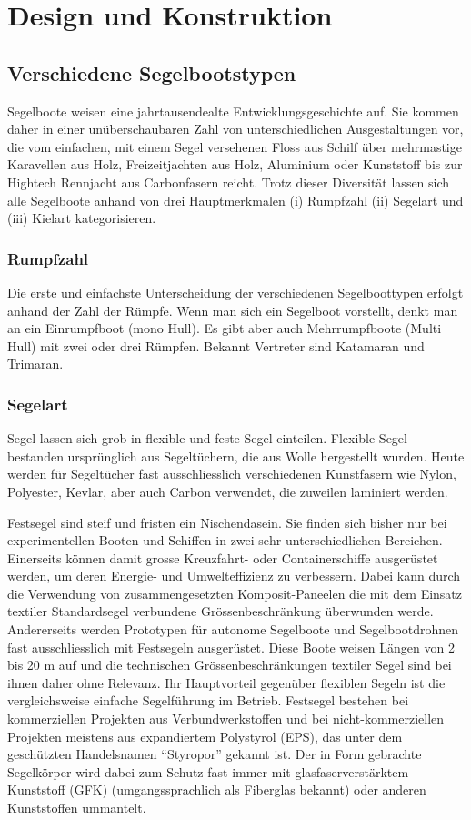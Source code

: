 


\label{chap:konstruktion}
\chapter{Design und Konstruktion}
\section{Verschiedene Segelbootstypen}
Segelboote weisen eine jahrtausendealte Entwicklungsgeschichte auf. Sie kommen daher in einer unüberschaubaren Zahl von unterschiedlichen Ausgestaltungen vor, die vom einfachen, mit einem Segel versehenen Floss aus Schilf über mehrmastige Karavellen aus Holz, Freizeitjachten aus Holz, Aluminium oder Kunststoff bis zur Hightech Rennjacht aus Carbonfasern reicht. Trotz dieser Diversität lassen sich alle Segelboote anhand von drei Hauptmerkmalen (i) Rumpfzahl (ii) Segelart und (iii) Kielart kategorisieren.
\subsection{Rumpfzahl}
Die erste und einfachste Unterscheidung der verschiedenen Segelboottypen erfolgt anhand der Zahl der Rümpfe. Wenn man sich ein Segelboot vorstellt, denkt man an ein Einrumpfboot (mono Hull). Es gibt aber auch Mehrrumpfboote (Multi Hull) mit zwei oder drei Rümpfen. Bekannt Vertreter sind Katamaran und Trimaran.
\subsection{Segelart}
Segel lassen sich grob in flexible und feste Segel einteilen. Flexible Segel bestanden ursprünglich aus Segeltüchern, die aus Wolle hergestellt wurden. Heute werden für Segeltücher fast ausschliesslich verschiedenen Kunstfasern wie Nylon, Polyester, Kevlar, aber auch Carbon verwendet, die zuweilen laminiert werden. 

Festsegel sind steif und fristen ein Nischendasein. Sie finden sich bisher nur bei experimentellen Booten und Schiffen in zwei sehr unterschiedlichen Bereichen. Einerseits können damit grosse Kreuzfahrt- oder Containerschiffe ausgerüstet werden, um deren Energie- und Umwelteffizienz zu verbessern. Dabei kann durch die Verwendung von zusammengesetzten Komposit-Paneelen die mit dem Einsatz textiler Standardsegel verbundene Grössenbeschränkung überwunden werde. \cite{redaktion_bv-grundsatz-zulassung_2022} Andererseits werden Prototypen für autonome Segelboote und Segelbootdrohnen fast ausschliesslich mit Festsegeln ausgerüstet. Diese Boote weisen Längen von 2 bis 20 m auf und die technischen Grössenbeschränkungen textiler Segel sind bei ihnen daher ohne Relevanz. Ihr Hauptvorteil gegenüber flexiblen Segeln ist die vergleichsweise einfache Segelführung im Betrieb. Festsegel bestehen bei kommerziellen Projekten aus Verbundwerkstoffen und bei nicht-kommerziellen Projekten meistens aus expandiertem Polystyrol (EPS), das unter dem geschützten Handelsnamen \enquote{Styropor} gekannt ist. Der in Form gebrachte Segelkörper wird dabei zum Schutz fast immer mit glasfaserverstärktem Kunststoff (GFK) (umgangssprachlich als Fiberglas bekannt) oder anderen Kunststoffen ummantelt.
